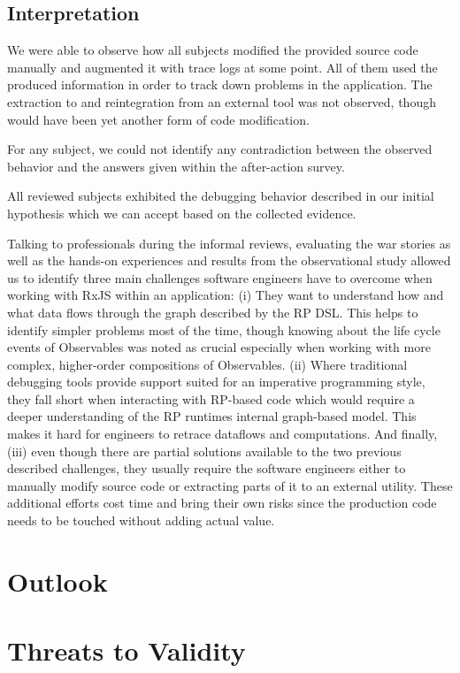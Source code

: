 \documentclass[12pt,a4paper]{article}
\begin{document}
\subsection{Interpretation}

We were able to observe how all subjects modified the provided source code manually and augmented it with trace logs at some point. All of them used the produced information in order to track down problems in the application. The extraction to and reintegration from an external tool was not observed, though would have been yet another form of code modification.

For any subject, we could not identify any contradiction between the observed behavior and the answers given within the after-action survey.

All reviewed subjects exhibited the debugging behavior described in our initial hypothesis which we can accept based on the collected evidence.

Talking to professionals during the informal reviews, evaluating the war stories as well as the hands-on experiences and results from the observational study allowed us to identify three main challenges software engineers have to overcome when working with RxJS within an application: (i) They want to understand how and what data flows through the graph described by the RP DSL. This helps to identify simpler problems most of the time, though knowing about the life cycle events of Observables was noted as crucial especially when working with more complex, higher-order compositions of Observables. (ii) Where traditional debugging tools provide support suited for an imperative programming style, they fall short when interacting with RP-based code which would require a deeper understanding of the RP runtimes internal graph-based model. This makes it hard for engineers to retrace dataflows and computations. And finally, (iii) even though there are partial solutions available to the two previous described challenges, they usually require the software engineers either to manually modify source code or extracting parts of it to an external utility. These additional efforts cost time and bring their own risks since the production code needs to be touched without adding actual value.


\section{Outlook}
\label{sec:future}


\section{Threats to Validity}
\label{sec:threats}
\end{document}
